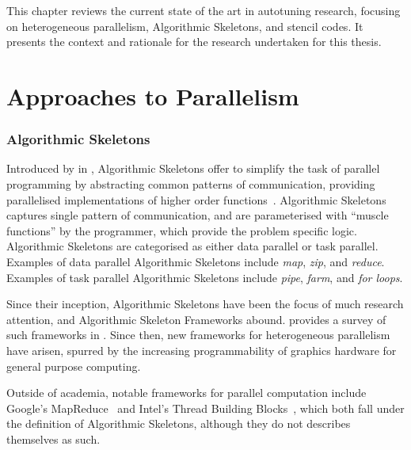 This chapter reviews the current state of the art in autotuning
research, focusing on heterogeneous parallelism, Algorithmic
Skeletons, and stencil codes. It presents the context and rationale
for the research undertaken for this thesis.


\section{Approaches to Parallelism}

\subsubsection{Algorithmic Skeletons}

Introduced by \citeauthor{Cole1989} in \citeyear{Cole1989},
Algorithmic Skeletons offer to simplify the task of parallel
programming by abstracting common patterns of communication, providing
parallelised implementations of higher order
functions~\cite{Cole1989}. Algorithmic Skeletons captures single
pattern of communication, and are parameterised with ``muscle
functions'' by the programmer, which provide the problem specific
logic. Algorithmic Skeletons are categorised as either data parallel
or task parallel. Examples of data parallel Algorithmic Skeletons
include \emph{map}, \emph{zip}, and \emph{reduce}. Examples of task
parallel Algorithmic Skeletons include \emph{pipe}, \emph{farm}, and
\emph{for loops}.

Since their inception, Algorithmic Skeletons have been the focus of
much research attention, and Algorithmic Skeleton Frameworks abound.
\citeauthor{Gonzalez2010} provides a survey of such frameworks in
\cite{Gonzalez2010}. Since then, new frameworks for heterogeneous
parallelism have arisen, spurred by the increasing programmability of
graphics hardware for general purpose computing.

Outside of academia, notable frameworks for parallel computation
include Google's MapReduce~\cite{Dean2008} and Intel's Thread Building
Blocks~\cite{IntelTBB}, which both fall under the definition of
Algorithmic Skeletons, although they do not describes themselves as
such.


